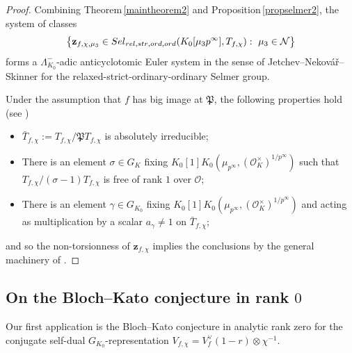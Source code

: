 \documentclass[10pt,letterpaper]{amsart}
\theoremstyle{plain}
\theoremstyle{definition}
\theoremstyle{definition}
\theoremstyle{plain}
\theoremstyle{plain}
\theoremstyle{plain}
\theoremstyle{remark}
\numberwithin{equation}{section}
\newcommand{\relstr}{{{\rm rel},{\rm str}}}
\newcommand{\ord}{{{\rm ord},{\rm ord}}}
\def\cO{\mathcal O}
\begin{document}
\begin{proof}
Combining Theorem\,\ref{maintheorem2} and Proposition\,\ref{propselmer2}, the system of classes
\begin{equation}\label{eq:ES-Lambda}
\bigl\{\mathbf{z}_{f,\chi,\mu_3}\in{\rm Sel}_{\relstr,\ord}(K_0[\mu_3p^\infty],T_{f,\chi})\,\colon\;\mu_3\in\mathcal{N}\bigr\}
\end{equation}
forms a $\Lambda_{K_0}^-$-adic anticyclotomic Euler system in the sense of Jetchev--Nekov\'a{\v r}--Skinner for the relaxed-strict-ordinary-ordinary Selmer group.

Under the assumption that $f$ has big image at $\mathfrak{P}$, the following properties hold (see \cite[Prop.\,7.1.6]{LLZ-K})
\begin{itemize}
    \item[(i)] $\bar{T}_{f,\chi}:=T_{f,\chi}/\mathfrak{P}T_{f,\chi}$ is absolutely irreducible;
    \item[(ii)] There is an element $\sigma\in G_K$ fixing $K_0[1]K_0(\mu_{p^\infty},(\cO_K^\times)^{1/p^\infty})$ such that $T_{f,\chi}/(\sigma-1)T_{f,\chi}$ is free of rank $1$ over $\cO$;
    \item[(iii)] There is an element $\gamma\in G_{K_0}$ fixing $K_0[1]K_0(\mu_{p^\infty},(\cO_K^\times)^{1/p^\infty})$ and acting as multiplication by a scalar $a_\gamma\neq 1$ on $\bar{T}_{f,\chi}$;
\end{itemize}
and so the non-torsionness of $\mathbf{z}_{f,\chi}$ implies the conclusions by the general machinery of \cite{JNS}.
\end{proof}






\subsection{On the Bloch--Kato conjecture in rank $0$}
\label{subsec:BK-def}

Our first application is the Bloch--Kato conjecture in analytic rank zero for the conjugate self-dual $G_{K_0}$-representation $V_{f,\chi}=V_f^\vee(1-r)\otimes\chi^{-1}$.
\end{document}
